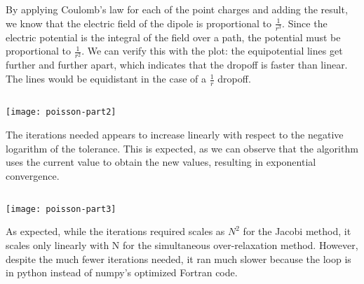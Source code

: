 \documentclass[10pt]{article}
\begin{document}
By applying Coulomb's law for each of the point charges and adding the result, we know that the electric field of the dipole is proportional to $ \frac{1}{r^3} $. Since the electric potential is the integral of the field over a path, the potential must be proportional to $ \frac{1}{r^2} $. We can verify this with the plot: the equipotential lines get further and further apart, which indicates that the dropoff is faster than linear. The lines would be equidistant in the case of a \(\frac{1}{r}\) dropoff.

\subsection{}
\texttt{[image: poisson-part2]}

The iterations needed appears to increase linearly with respect to the negative logarithm of the tolerance. This is expected, as we can observe that the algorithm uses the current value to obtain the new values, resulting in exponential convergence.

\subsection{}
\texttt{[image: poisson-part3]}

As expected, while the iterations required scales as $N^2$ for the  Jacobi method, it scales only linearly with N for the simultaneous over-relaxation method. However, despite the much fewer iterations needed, it ran much slower because the loop is in python instead of numpy's optimized Fortran code.
\end{document}
